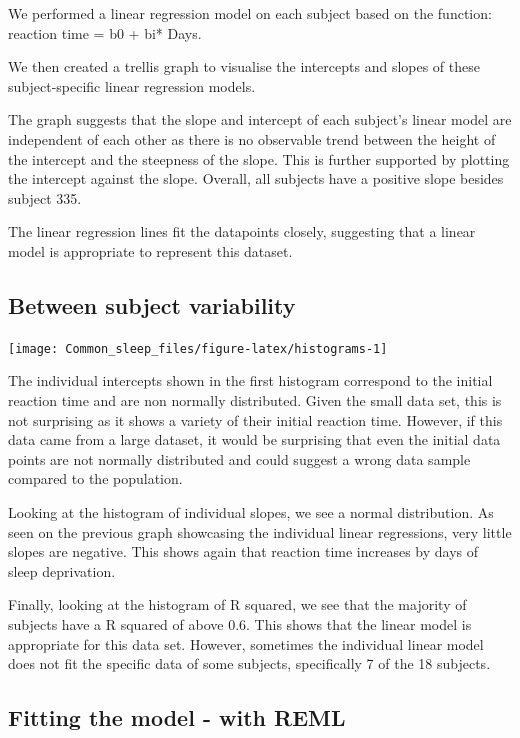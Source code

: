 \documentclass[
]{article}
\begin{document}
We performed a linear regression model on each subject based on the
function: reaction time = b0 + bi* Days.

We then created a trellis graph to visualise the intercepts and slopes
of these subject-specific linear regression models.

The graph suggests that the slope and intercept of each subject's linear
model are independent of each other as there is no observable trend
between the height of the intercept and the steepness of the slope. This
is further supported by plotting the intercept against the slope.
Overall, all subjects have a positive slope besides subject 335.

The linear regression lines fit the datapoints closely, suggesting that
a linear model is appropriate to represent this dataset.

\hypertarget{between-subject-variability}{%
\subsection{Between subject
variability}\label{between-subject-variability}}

\begin{center}\texttt{[image: Common\_sleep\_files/figure-latex/histograms-1]} \end{center}

The individual intercepts shown in the first histogram correspond to the
initial reaction time and are non normally distributed. Given the small
data set, this is not surprising as it shows a variety of their initial
reaction time. However, if this data came from a large dataset, it would
be surprising that even the initial data points are not normally
distributed and could suggest a wrong data sample compared to the
population.

Looking at the histogram of individual slopes, we see a normal
distribution. As seen on the previous graph showcasing the individual
linear regressions, very little slopes are negative. This shows again
that reaction time increases by days of sleep deprivation.

Finally, looking at the histogram of R squared, we see that the majority
of subjects have a R squared of above 0.6. This shows that the linear
model is appropriate for this data set. However, sometimes the
individual linear model does not fit the specific data of some subjects,
specifically 7 of the 18 subjects.

\hypertarget{fitting-the-model---with-reml}{%
\subsection{Fitting the model - with
REML}\label{fitting-the-model---with-reml}}
\end{document}
